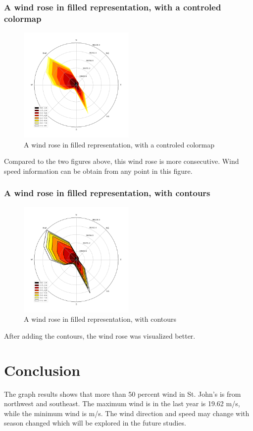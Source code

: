 \documentclass[10pt]{report}
\begin{document}
\subsection{A wind rose in filled representation, with a controled colormap}
 \begin{figure}[h!]
    \centering
    \includegraphics[width=0.50\textwidth]{images/figure4.png}
    \caption{A wind rose in filled representation, with a controled colormap}
    \label{fig: PaleBlueDot}    
\end{figure}
Compared to the two figures above, this wind rose is more consecutive. Wind speed information can be obtain from any point in this figure.

\subsection{A wind rose in filled representation, with contours}
 \begin{figure}[h!]
    \centering
    \includegraphics[width=0.50\textwidth]{images/figure5.png}
    \caption{A wind rose in filled representation, with contours}
    \label{fig: PaleBlueDot}    
\end{figure}
After adding the contours, the wind rose was visualized better.
 
 \chapter{Conclusion}
 The graph results shows that more than 50 percent wind in St. John's is from northwest and southeast. The maximum wind is in the last year is 19.62 m/s, while the minimum wind is m/s. The wind direction and speed may change with season changed which will be explored in the future studies.

\printbibliography
\end{document}
